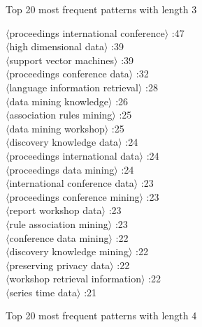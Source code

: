 \documentclass[11pt,a4paper,fleqn]{article}
\begin{document}
Top 20 most frequent patterns with length 3
\begin{multicols}{2} \noindent
$\langle$proceedings international conference$\rangle$ :47\\
$\langle$high dimensional data$\rangle$ :39\\
$\langle$support vector machines$\rangle$ :39\\
$\langle$proceedings conference data$\rangle$ :32\\
$\langle$language information retrieval$\rangle$ :28\\
$\langle$data mining knowledge$\rangle$ :26\\
$\langle$association rules mining$\rangle$ :25\\
$\langle$data mining workshop$\rangle$ :25\\
$\langle$discovery knowledge data$\rangle$ :24\\
$\langle$proceedings international data$\rangle$ :24\\
$\langle$proceedings data mining$\rangle$ :24\\
$\langle$international conference data$\rangle$ :23\\
$\langle$proceedings conference mining$\rangle$ :23\\
$\langle$report workshop data$\rangle$ :23\\
$\langle$rule association mining$\rangle$ :23\\
$\langle$conference data mining$\rangle$ :22\\
$\langle$discovery knowledge mining$\rangle$ :22\\
$\langle$preserving privacy data$\rangle$ :22\\
$\langle$workshop retrieval information$\rangle$ :22\\
$\langle$series time data$\rangle$ :21\\
\end{multicols} \noindent
Top 20 most frequent patterns with length 4
\end{document}

